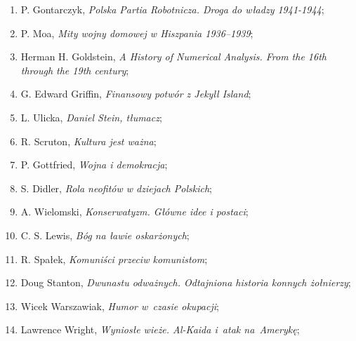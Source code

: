 \documentclass[a4paper,11pt]{article}
\begin{document}
\begin{enumerate}
\item P. Gontarczyk, \textit{Polska Partia Robotnicza. Droga do władzy
    1941-1944};



\item P. Moa, \textit{Mity wojny domowej w Hiszpania 1936--1939};



\item Herman H. Goldstein, \textit{A History of Numerical Analysis. From
    the 16th through the 19th century};



\item G. Edward Griffin, \textit{Finansowy potwór z Jekyll Island};



\item L. Ulicka, \textit{Daniel Stein, tłumacz};



\item R. Scruton, \textit{Kultura jest ważna};



\item P. Gottfried, \textit{Wojna i demokracja};



\item S. Didler, \textit{Rola neofitów w dziejach Polskich};



\item A. Wielomski, \textit{Konserwatyzm. Główne idee i postaci};



\item C. S. Lewis, \textit{Bóg na ławie oskarżonych};



\item R. Spałek, \textit{Komuniści przeciw komunistom};



\item Doug Stanton, \textit{Dwunastu odważnych. Odtajniona historia
    konnych żołnierzy};



\item Wicek Warszawiak, \textit{Humor w~czasie okupacji};



\item Lawrence Wright, \textit{Wyniosłe wieże. Al-Kaida i~atak
    na~Amerykę};




\end{enumerate}
\end{document}

